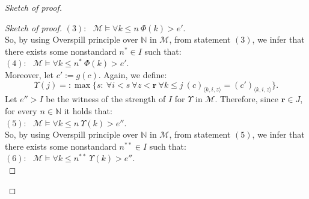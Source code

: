 \documentclass[11pt]{article}
\theoremstyle{plain}
\theoremstyle{definition}
\newcommand{\M}{\mathcal{M}}
\newcommand{\NN}{\mathbb{N}}
\begin{document}
\begin{proof}[Sketch of proof]
\begin{proof}[Sketch of proof]
$(3): \ \ \ $$\M\models\forall k\leq n \ \Phi(k)>e'.$\\

So, by using Overspill principle over $\NN$ in $\M$, from statement $(3)$, we infer that there exists some nonstandard  $n^{*}\in I$ such that:\\

$(4): \ \ \ $$\M\models\forall k\leq n^{*} \ \Phi(k)>e'.$\\

Moreover, let $c':=g(c)$. Again, we define:
$$\Upsilon(j)=:\max\{s: \ \forall i<s \ \forall z<\textbf{r} \ \forall k\leq j \ (c)_{\langle k,i,z\rangle}=(c')_{\langle k,i,z\rangle}\} .$$
Let $e''>I$ be the witness of the strength of $I$ for $\Upsilon $ in $\M$. Therefore, since $\textbf{r}\in J$,  for every $n\in\NN$ it holds that:\\

$(5): \ \ \ $$\M\models\forall k\leq n \ \Upsilon(k)>e''.$\\

So, by using Overspill principle over $\NN$ in $\M$, from statement $(5)$, we infer that there exists some nonstandard  $n^{**}\in I$ such that:\\

$(6): \ \ \ $$\M\models\forall k\leq n^{**} \ \Upsilon(k)>e''.$\\


\end{proof}
\end{proof}
\end{document}
